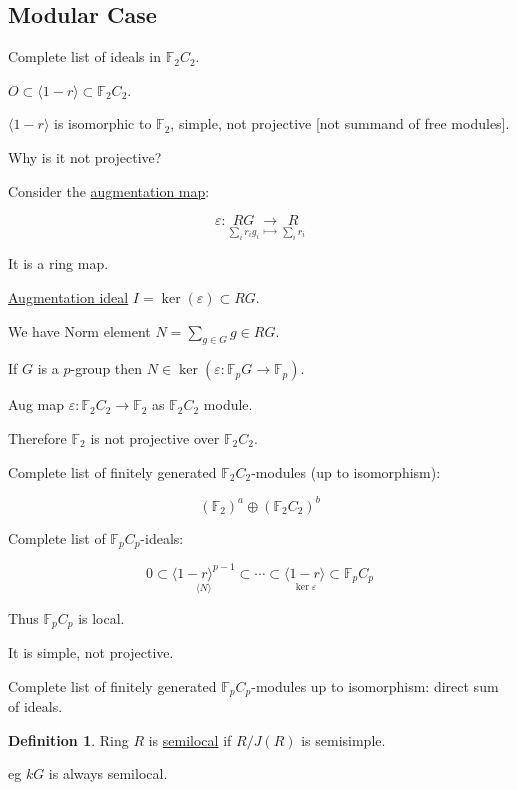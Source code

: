 \documentclass{article}
\theoremstyle{definition}
\newtheorem*{definition}{Definition}
\begin{document}
\subsection*{Modular Case}

Complete list of ideals in \(\mathbb{F}_2 C_2\).

\(O \subset \langle 1 - r \rangle \subset \mathbb{F}_2 C_2\).

\(\langle 1-r \rangle\) is isomorphic to \(\mathbb{F}_2\), simple, not projective [not summand of free modules].

Why is it not projective?

Consider the \underline{augmentation map}:

\[
    \varepsilon : \underset{\sum_{i} r_i g_i}{RG} \underset{\mapsto}{\to} \underset{\sum_{i} r_i}{R}
\]

It is a ring map.

\underline{Augmentation ideal} \(I = \ker(\varepsilon) \subset RG\).

We have Norm element \(N = \sum_{g\in G} g \in RG\).

If \(G\) is a \(p\)-group then \(N \in \ker (\varepsilon : \mathbb{F}_p G \to \mathbb{F}_p)\).

Aug map \(\varepsilon : \mathbb{F}_2 C_2 \to \mathbb{F}_2\) as \(\mathbb{F}_2 C_2\) module.

Therefore \(\mathbb{F}_2\) is not projective over \(\mathbb{F}_2 C_2\).

Complete list of finitely generated \(\mathbb{F}_2 C_2\)-modules (up to isomorphism):

\[
    (\mathbb{F}_2)^a \oplus (\mathbb{F}_2 C_2)^b
\]

Complete list of \(\mathbb{F}_p C_p\)-ideals:

\[
    0 \subset \underset{\langle N \rangle}{\langle 1-r \rangle^{p-1}} \subset \cdots \subset \underset{\ker \varepsilon}{\langle 1-r \rangle} \subset \mathbb{F}_p C_p
\]

Thus \(\mathbb{F}_p C_p\) is local.

It is simple, not projective.

Complete list of finitely generated \(\mathbb{F}_p C_p\)-modules up to isomorphism: direct sum of ideals.

\begin{definition}
    Ring \(R\) is \underline{semilocal} if \(R / J(R)\) is semisimple.
\end{definition}

eg \(kG\) is always semilocal.
\end{document}
